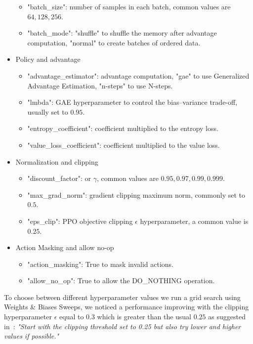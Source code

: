 \documentclass[11pt, a4paper, hidelinks]{report}
\begin{document}
\begin{itemize}
\begin{itemize}
		\item "batch\_size": number of samples in each batch, common values are $64, 128, 256$.
		\item "batch\_mode": "shuffle" to shuffle the memory after advantage computation, "normal" to create batches of ordered data.
	\end{itemize}
	\item Policy and advantage
	\begin{itemize}
		\item "advantage\_estimator": advantage computation, "gae" to use Generalized Advantage Estimation, "n-steps" to use N-steps.
		\item "lmbda": GAE hyperparameter to control the bias–variance trade-off, usually set to $0.95$.
		\item "entropy\_coefficient": coefficient multiplied to the entropy loss.
		\item "value\_loss\_coefficient": coefficient multiplied to the value loss.
	\end{itemize}
	\item Normalization and clipping
	\begin{itemize}
		\item "discount\_factor": or $\gamma$, common values are $0.95, 0.97, 0.99, 0.999$.
		\item "max\_grad\_norm": gradient clipping maximum norm, commonly set to $0.5$.
		\item "eps\_clip": PPO objective clipping $\epsilon$ hyperparameter, a common value is $0.25$.
	\end{itemize}
	\item Action Masking and allow no-op
	\begin{itemize}
		\item "action\_masking": True to mask invalid actions.
		\item "allow\_no\_op": True to allow the DO\_NOTHING operation.
	\end{itemize}
\end{itemize}

To choose between different hyperparameter values we run a grid search using Weights \& Biases Sweeps, we noticed a performance improving with the clipping hyperparameter $\epsilon$ equal to $0.3$ which is greater than the usual $0.25$ as suggested in~\citep{ppo-implementation-2}: \textit{"Start with the clipping threshold set to 0.25 but also try lower and higher values if possible."}
\end{document}

